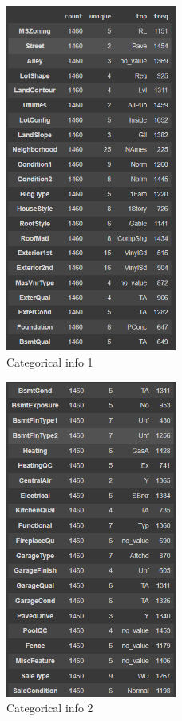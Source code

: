 \begin{figure}[h!]
    \centering
    \includegraphics[width=0.5\textwidth]{imgs/info3.png}
    \caption{Categorical info 1}
    \label{fig:info3}
\end{figure}
\newpage
\begin{figure}[h!]
    \centering
    \includegraphics[width=0.5\textwidth]{imgs/info4.png}
    \caption{Categorical info 2}
    \label{fig:info4}
\end{figure}
\newpage

